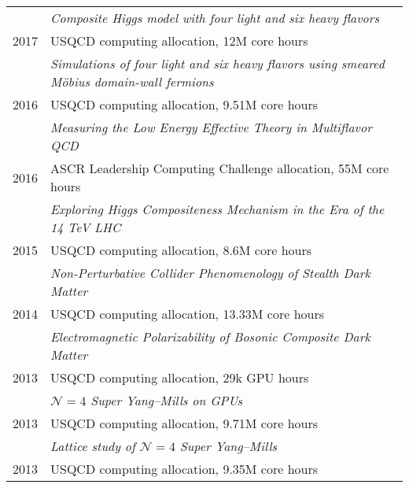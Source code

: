 \begin{spacelist}
\begin{tabular}[t]{cl}
           & \textit{Composite Higgs model with four light and six heavy flavors}                                 \\[6 pt]
      2017 & USQCD computing allocation, 12M core hours                                                           \\ %
           & \textit{Simulations of four light and six heavy flavors using smeared M\"obius domain-wall fermions} \\[6 pt]
      2016 & USQCD computing allocation, 9.51M core hours                                                         \\ %
           & \textit{Measuring the Low Energy Effective Theory in Multiflavor QCD}                                \\[6 pt]
      2016 & ASCR Leadership Computing Challenge allocation, 55M core hours                                       \\ %
           & \textit{Exploring Higgs Compositeness Mechanism in the Era of the 14 TeV LHC}                        \\[6 pt]
      2015 & USQCD computing allocation, 8.6M core hours                                                          \\ %
           & \textit{Non-Perturbative Collider Phenomenology of Stealth Dark Matter}                              \\[6 pt]
      2014 & USQCD computing allocation, 13.33M core hours                                                        \\ %
           & \textit{Electromagnetic Polarizability of Bosonic Composite Dark Matter}                             \\[6 pt]
      2013 & USQCD computing allocation, 29k GPU hours                                                            \\ %
           & \textit{$\mathcal N = 4$ Super Yang--Mills on GPUs}                                                  \\[6 pt]
      2013 & USQCD computing allocation, 9.71M core hours                                                         \\ %
           & \textit{Lattice study of $\mathcal N = 4$ Super Yang--Mills}                                         \\[6 pt]
      2013 & USQCD computing allocation, 9.35M core hours                                                         \\ %

\end{tabular}
\end{spacelist}
